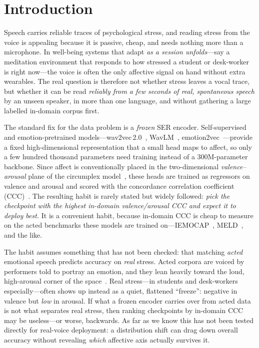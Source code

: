 \documentclass[conference]{IEEEtran}
\begin{document}
\section{Introduction}

Speech carries reliable traces of psychological stress, and reading stress from
the voice is appealing because it is passive, cheap, and needs nothing more than
a microphone. In well-being systems that adapt \emph{as a session unfolds}---say a
meditation environment that responds to how stressed a student or desk-worker is
right now---the voice is often the only affective signal on hand without extra
wearables. The real question is therefore not whether stress leaves a vocal trace,
but whether it can be read \emph{reliably from a few seconds of real, spontaneous
speech} by an unseen speaker, in more than one language, and without gathering a
large labelled in-domain corpus first.

The standard fix for the data problem is a \emph{frozen} SER encoder.
Self-supervised and emotion-pretrained models---wav2vec\,2.0~\cite{wav2vec2},
WavLM~\cite{wavlm}, emotion2vec~\cite{emotion2vec}---provide a fixed
high-dimensional representation that a small head maps to affect, so only a few
hundred thousand parameters need training instead of a 300M-parameter backbone.
Since affect is conventionally placed in the two-dimensional
\emph{valence--arousal} plane of the circumplex model~\cite{russell1980}, these
heads are trained as regressors on valence and arousal and scored with the
concordance correlation coefficient (CCC)~\cite{lin1989ccc}. The resulting habit
is rarely stated but widely followed: \emph{pick the checkpoint with the highest
in-domain valence/arousal CCC and expect it to deploy best.} It is a convenient
habit, because in-domain CCC is cheap to measure on the acted benchmarks these
models are trained on---IEMOCAP~\cite{iemocap}, MELD~\cite{meld}, and the like.

The habit assumes something that has not been checked: that matching \emph{acted}
emotional speech predicts accuracy on \emph{real} stress. Acted corpora are voiced
by performers told to portray an emotion, and they lean heavily toward the loud,
high-arousal corner of the space~\cite{douglascowie2003}. Real stress---in
students and desk-workers especially---often shows up instead as a quiet,
flattened ``freeze'': negative in valence but \emph{low} in arousal. If what a
frozen encoder carries over from acted data is not what separates real stress,
then ranking checkpoints by in-domain CCC may be useless---or worse, backwards. As
far as we know this has not been tested directly for real-voice deployment: a
distribution shift can drag down overall accuracy without revealing \emph{which}
affective axis actually survives it.
\end{document}

